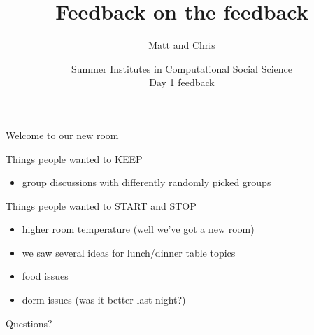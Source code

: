 \documentclass{beamer}
\title[]{Feedback on the feedback}
\author[]{Matt and Chris}
\date[]{Summer Institutes in Computational Social Science\\Day 1 feedback
}
\begin{document}
\frame{\titlepage}
\begin{frame}

{\Large
\begin{center}
Welcome to our new room
\end{center}
}

\end{frame}
\begin{frame}

Things people wanted to KEEP
\begin{itemize}
\item group discussions with differently randomly picked groups
\end{itemize}

\end{frame}
\begin{frame}

Things people wanted to START and STOP
\begin{itemize}
\item higher room temperature (well we've got a new room)
\pause
\item we saw several ideas for lunch/dinner table topics
\pause
\item food issues
\pause
\item dorm issues (was it better last night?)
\end{itemize}

\end{frame}
\begin{frame}

\begin{center}
\LARGE
Questions?
\end{center}

\end{frame}
\end{document}
